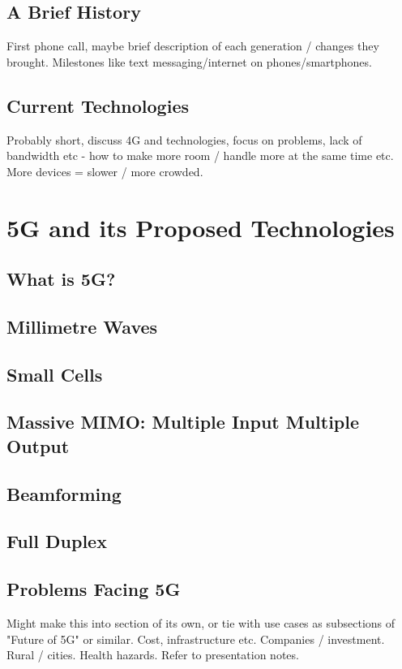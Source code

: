 \documentclass[journal]{IEEEtran}
\begin{document}
\subsection{A Brief History}
First phone call, maybe brief description of each generation / changes they brought. Milestones like text messaging/internet on phones/smartphones.
\subsection{Current Technologies}
Probably short, discuss 4G and technologies, focus on problems, lack of bandwidth etc - how to make more room / handle more at the same time etc. More devices = slower / more crowded.

\section{5G and its Proposed Technologies}
\subsection{What is 5G?}
\subsection{Millimetre Waves}
\subsection{Small Cells}
\subsection{Massive MIMO: Multiple Input Multiple Output}
\subsection{Beamforming}
\subsection{Full Duplex}
\subsection{Problems Facing 5G}
Might make this into section of its own, or tie with use cases as subsections of "Future of 5G" or similar.
Cost, infrastructure etc. Companies / investment. Rural / cities. Health hazards. Refer to presentation notes.
\end{document}
